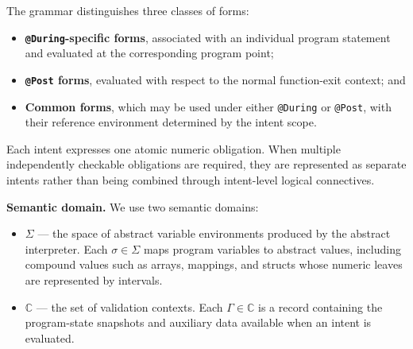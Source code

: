 \documentclass[11pt,oneside]{report}
\theoremstyle{plain}
\theoremstyle{definition}
\theoremstyle{remark}
\begin{document}
The grammar distinguishes three classes of forms:
\begin{itemize}
    \item \textbf{\texttt{@During}-specific forms}, associated with an individual program statement and evaluated at the corresponding program point;
    \item \textbf{\texttt{@Post} forms}, evaluated with respect to the normal function-exit context; and
    \item \textbf{Common forms}, which may be used under either \texttt{@During} or \texttt{@Post}, with their reference environment determined by the intent scope.
\end{itemize}

Each intent expresses one atomic numeric obligation.
When multiple independently checkable obligations are required, they are represented as separate intents rather than being combined through intent-level logical connectives.

\smallskip
\noindent\textbf{Semantic domain.}
We use two semantic domains:
\begin{itemize}
    \item $\Sigma$ --- the space of abstract variable environments produced by
    the abstract interpreter. Each $\sigma \in \Sigma$ maps program variables
    to abstract values, including compound values such as arrays, mappings,
    and structs whose numeric leaves are represented by intervals.
    \item $\mathbb{C}$ --- the set of validation contexts. Each
    $\Gamma \in \mathbb{C}$ is a record containing the program-state snapshots
    and auxiliary data available when an intent is evaluated.
\end{itemize}
\end{document}
